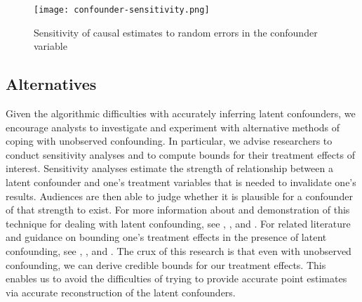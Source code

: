 \begin{figure}
   \centering
   \texttt{[image: confounder-sensitivity.png]}
   \caption{Sensitivity of causal estimates to random errors in the confounder variable}
   \label{fig:confounder-sensitivity}
\end{figure}

\subsection{Alternatives}
\label{sec:deconfounder-alternatives}
Given the algorithmic difficulties with accurately inferring latent confounders,
we encourage analysts to investigate and experiment with alternative methods of
coping with unobserved confounding.
In particular, we advise researchers to conduct sensitivity analyses and to compute bounds for their treatment effects of interest.
Sensitivity analyses estimate the strength of relationship between a latent confounder and one's treatment variables that is needed to invalidate one's results.
Audiences are then able to judge whether it is plausible for a confounder of that strength to exist.
For more information about and demonstration of this technique for dealing with latent confounding,
see \citet{rosenbaum_1983_assessing}, \citet{liu_2013_introduction}, and \citet{jung_2020_bayesian}.
For related literature and guidance on bounding one's treatment effects in the presence of latent confounding,
see \citet{manski_1990_nonparametric}, \citet{richardson_2014_nonparametric}, and \citet{geiger_2014_estimating}.
The crux of this research is that even with unobserved confounding, we can derive credible bounds for our treatment effects.
This enables us to avoid the difficulties of trying to provide accurate point estimates via accurate reconstruction of the latent confounders.
